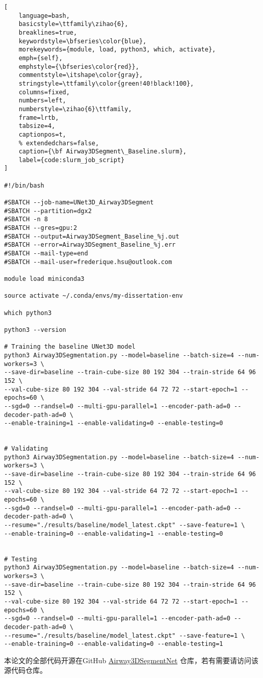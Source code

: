 \begin{lstlisting}[
    language=bash,
    basicstyle=\ttfamily\zihao{6},
    breaklines=true,
    keywordstyle=\bfseries\color{blue},
    morekeywords={module, load, python3, which, activate},
    emph={self},
    emphstyle={\bfseries\color{red}},
    commentstyle=\itshape\color{gray},
    stringstyle=\ttfamily\color{green!40!black!100},
    columns=fixed,
    numbers=left,
    numberstyle=\zihao{6}\ttfamily,
    frame=lrtb,
    tabsize=4,
    captionpos=t,
    % extendedchars=false,
    caption={\bf Airway3DSegment\_Baseline.slurm},
    label={code:slurm_job_script}
]

#!/bin/bash

#SBATCH --job-name=UNet3D_Airway3DSegment
#SBATCH --partition=dgx2
#SBATCH -n 8
#SBATCH --gres=gpu:2
#SBATCH --output=Airway3DSegment_Baseline_%j.out
#SBATCH --error=Airway3DSegment_Baseline_%j.err
#SBATCH --mail-type=end
#SBATCH --mail-user=frederique.hsu@outlook.com

module load miniconda3

source activate ~/.conda/envs/my-dissertation-env

which python3

python3 --version

# Training the baseline UNet3D model
python3 Airway3DSegmentation.py --model=baseline --batch-size=4 --num-workers=3 \
--save-dir=baseline --train-cube-size 80 192 304 --train-stride 64 96 152 \ 
--val-cube-size 80 192 304 --val-stride 64 72 72 --start-epoch=1 --epochs=60 \
--sgd=0 --randsel=0 --multi-gpu-parallel=1 --encoder-path-ad=0 --decoder-path-ad=0 \
--enable-training=1 --enable-validating=0 --enable-testing=0


# Validating
python3 Airway3DSegmentation.py --model=baseline --batch-size=4 --num-workers=3 \
--save-dir=baseline --train-cube-size 80 192 304 --train-stride 64 96 152 \
--val-cube-size 80 192 304 --val-stride 64 72 72 --start-epoch=1 --epochs=60 \
--sgd=0 --randsel=0 --multi-gpu-parallel=1 --encoder-path-ad=0 --decoder-path-ad=0 \
--resume="./results/baseline/model_latest.ckpt" --save-feature=1 \
--enable-training=0 --enable-validating=1 --enable-testing=0


# Testing
python3 Airway3DSegmentation.py --model=baseline --batch-size=4 --num-workers=3 \
--save-dir=baseline --train-cube-size 80 192 304 --train-stride 64 96 152 \
--val-cube-size 80 192 304 --val-stride 64 72 72 --start-epoch=1 --epochs=60 \
--sgd=0 --randsel=0 --multi-gpu-parallel=1 --encoder-path-ad=0 --decoder-path-ad=0 \
--resume="./results/baseline/model_latest.ckpt" --save-feature=1 \
--enable-training=0 --enable-validating=0 --enable-testing=1

\end{lstlisting}

本论文的全部代码开源在GitHub \href{https://github.com/Frederick-Hsu/Airway3DSegmentNet}{Airway3DSegmentNet}
仓库，若有需要请访问该源代码仓库。